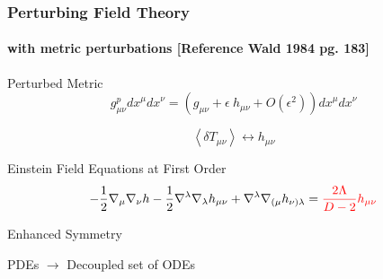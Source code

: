 \documentclass[xcolor=dvipsnames]{beamer}
\begin{document}
\begin{frame}
  \frametitle{Perturbing Field Theory}
  \framesubtitle{with metric perturbations [Reference Wald 1984 pg. 183]}

  \begin{block}{Perturbed Metric}
    \begin{equation*}
      g^{p}_{\mu\nu} {dx}^\mu {dx}^\nu = \left(g_{\mu\nu}+\epsilon~h_{\mu\nu}+O(\epsilon^2)\right) {dx}^\mu {dx}^\nu
    \end{equation*}

    \begin{equation*}
      \left\langle \delta T_{\mu\nu}\right\rangle\longleftrightarrow h_{\mu\nu}
    \end{equation*}
  \end{block}

  \begin{block}{Einstein Field Equations at First Order}
    \begin{equation*}
      -\frac{1}{2}\nabla_\mu \nabla_\nu h-\frac{1}{2}\nabla^\lambda \nabla_\lambda h_{\mu\nu}+\nabla^\lambda \nabla_{(\mu}h_{\nu)\lambda} = \textcolor{red}{\frac{2\Lambda}{D-2}h_{\mu\nu}}
    \end{equation*}
  \end{block}


  \begin{block}{Enhanced Symmetry}
    \begin{center}PDEs $\rightarrow$ Decoupled set of ODEs\end{center}
  \end{block}

\end{frame}
\end{document}
